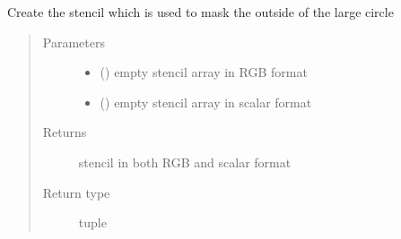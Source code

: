 \documentclass[letterpaper,10pt,english]{sphinxmanual}
\begin{document}
\begin{fulllineitems}
\label{\detokenize{createregions:createregions.create_stencil}}
Create the stencil which is used to mask the outside of the large circle
\begin{quote}\begin{description}
\item[{Parameters}] \leavevmode\begin{itemize}
\item {} 
 () \textendash{} empty stencil array in RGB format

\item {} 
 () \textendash{} empty stencil array in scalar format

\end{itemize}

\item[{Returns}] \leavevmode
stencil in both RGB and scalar format

\item[{Return type}] \leavevmode
tuple

\end{description}\end{quote}

\end{fulllineitems}

\end{document}
